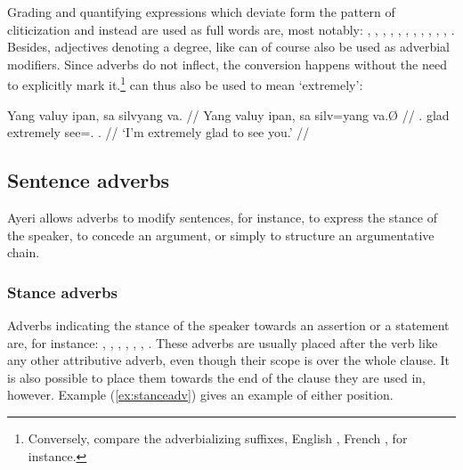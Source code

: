 Grading and quantifying expressions which deviate form the pattern of 
cliticization and instead are used as full words are, most notably:
,
,
,
,
,
,
,
,
,
,
,
.
Besides, adjectives denoting a degree, like  can of course also be used as adverbial modifiers. Since adverbs do 
not inflect, the conversion happens without the need to explicitly mark 
it.\footnote{Conversely, compare the adverbializing suffixes, English , 
French , for instance.}  can thus also be used to 
mean `extremely':

\ex
\begingl
	\gla Yang valuy ipan, sa silvyang va. //
	\glb Yang valuy ipan, sa silv=yang va.Ø //
	\glc \Fsg{}.\Aarg{} glad extremely \PatT{} see=\Fsg{}.\Aarg{} 
		\Ssg{}.\Top{} //
	\glft `I'm extremely glad to see you.' //
\endgl
\xe


\subsection{Sentence adverbs}

Ayeri allows adverbs to modify sentences, for instance, to express the stance 
of the speaker, to concede an argument, or simply to structure an argumentative 
chain.

\subsubsection{Stance adverbs}

Adverbs indicating the stance of the speaker towards an assertion or a 
statement are, for instance:
, 
,
,
,
,
,
.
These adverbs are usually placed after the verb like any other attributive 
adverb, even though their scope is over the whole clause. It is also possible 
to place them towards the end of the clause they are used in, however. Example 
(\ref{ex:stanceadv}) gives an example of either position.

